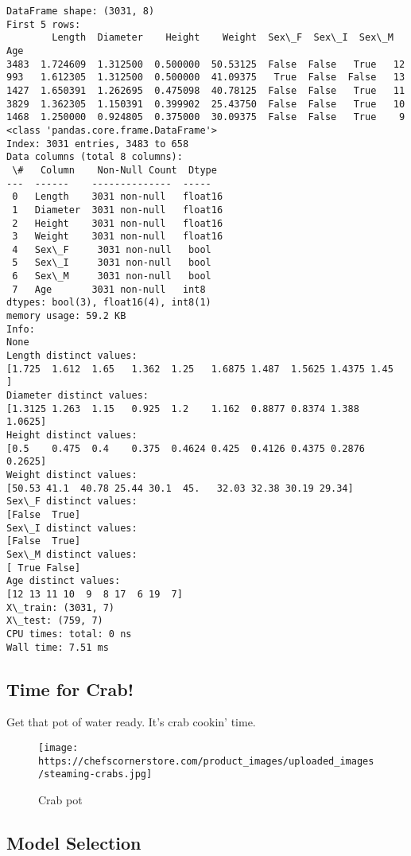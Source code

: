 \documentclass[11pt]{article}
\begin{document}
    \begin{Verbatim}[commandchars=\\\{\}]
DataFrame shape: (3031, 8)
First 5 rows:
        Length  Diameter    Height    Weight  Sex\_F  Sex\_I  Sex\_M  Age
3483  1.724609  1.312500  0.500000  50.53125  False  False   True   12
993   1.612305  1.312500  0.500000  41.09375   True  False  False   13
1427  1.650391  1.262695  0.475098  40.78125  False  False   True   11
3829  1.362305  1.150391  0.399902  25.43750  False  False   True   10
1468  1.250000  0.924805  0.375000  30.09375  False  False   True    9
<class 'pandas.core.frame.DataFrame'>
Index: 3031 entries, 3483 to 658
Data columns (total 8 columns):
 \#   Column    Non-Null Count  Dtype
---  ------    --------------  -----
 0   Length    3031 non-null   float16
 1   Diameter  3031 non-null   float16
 2   Height    3031 non-null   float16
 3   Weight    3031 non-null   float16
 4   Sex\_F     3031 non-null   bool
 5   Sex\_I     3031 non-null   bool
 6   Sex\_M     3031 non-null   bool
 7   Age       3031 non-null   int8
dtypes: bool(3), float16(4), int8(1)
memory usage: 59.2 KB
Info:
None
Length distinct values:
[1.725  1.612  1.65   1.362  1.25   1.6875 1.487  1.5625 1.4375 1.45  ]
Diameter distinct values:
[1.3125 1.263  1.15   0.925  1.2    1.162  0.8877 0.8374 1.388  1.0625]
Height distinct values:
[0.5    0.475  0.4    0.375  0.4624 0.425  0.4126 0.4375 0.2876 0.2625]
Weight distinct values:
[50.53 41.1  40.78 25.44 30.1  45.   32.03 32.38 30.19 29.34]
Sex\_F distinct values:
[False  True]
Sex\_I distinct values:
[False  True]
Sex\_M distinct values:
[ True False]
Age distinct values:
[12 13 11 10  9  8 17  6 19  7]
X\_train: (3031, 7)
X\_test: (759, 7)
CPU times: total: 0 ns
Wall time: 7.51 ms
    \end{Verbatim}

    \subsection{Time for Crab!}\label{time-for-crab}

Get that pot of water ready. It's crab cookin' time.

\begin{figure}
\centering
\texttt{[image: https://chefscornerstore.com/product\_images/uploaded\_images/steaming-crabs.jpg]}
\caption{Crab pot}
\end{figure}

    \subsection{Model Selection}\label{model-selection}
\end{document}
